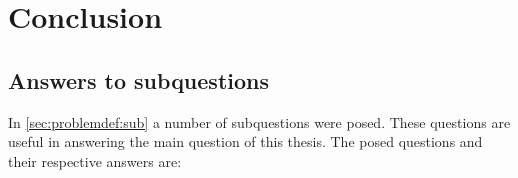 
\chapter{Conclusion} %

\label{chap:conclusion} %


\section{Answers to subquestions}
In \ref{sec:problemdef:sub} a number of subquestions were posed. These questions are useful in answering the main question of this thesis. The posed questions and their respective answers are:
